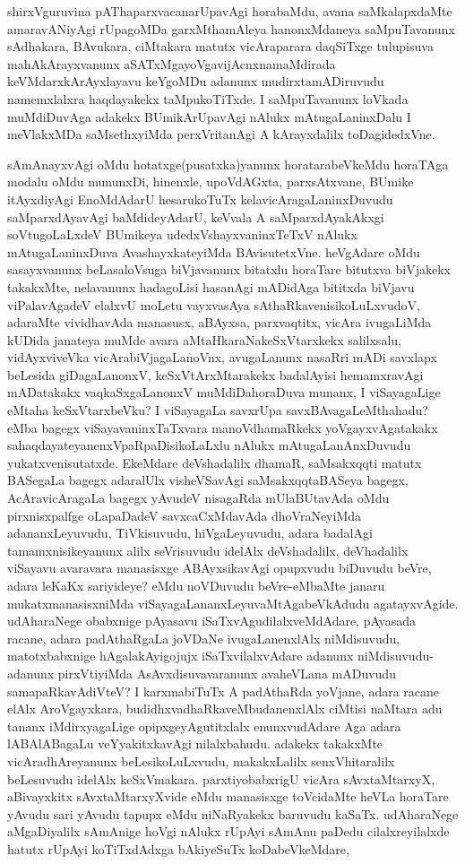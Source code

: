 shirxVguruvina pAThaparxvacanarUpavAgi horabaMdu, avana saMkalapxdaMte amara\-vANiyAgi \-rUpa\-goMDa garxMtha\-mAleya hanonxMdaneya saMpuTavanunx sAdha\-kara, BAvukara, ciMtakara matutx vicAraparara daqSiTxge tulupisuva mahAkArayxvanunx aSATxMgayoVgavijAcnxnamaMdirada keVMdarxkArAyxlayavu keYgoMDu adanunx mudirxta\-mADi\-ruvudu namemxlalxra haqdayakekx taMpukoTiTxde. I saMpuTavanunx loVkada muMdiDu\-vAga adakekx BUmikArUpavAgi nAlukx mAtugaLaninxDalu I meVlakxMDa saMsethx\-yiMda perxVritanAgi A kArayxdalilx toDagidedxVne.

sAmAnayxvAgi oMdu hotatxge(pusatxka)yanunx horatara\-beVkeMdu horaTAga modalu oMdu  mununxDi, hinenxle, upoV\-dAGxta, parxsAtxvane, BUmike itAyxdiyAgi EnoMdAdarU hesarukoTuTx kela\-vicAra\-gaLaninxDu\-vudu saMparxdAyavAgi baMdide\-yAdarU, keVvala A saMparxdAyakAkxgi soVtu\-goLaLxdeV BUmikeya udedxVshayx\-vaninxTeTxV nAlukx mAtugaLaninxDuva AvashayxkateyiMda BAvisutetxVne. heVgAdare oMdu sasayxvanunx beLasaloVsuga biVjavanunx bitatxlu horaTare bitutxva biVjakekx takakxMte, nelavanunx hadagoLisi hasanAgi mADidAga bititxda biVjavu viPalavAgadeV elalxvU moLetu vayxvasAya sAthaRka\-venisi\-koLuLx\-vudoV, adaraMte vividhavAda \hbox{manasusx}, aBAyxsa, parxvaqtitx, vicAra ivugaLiMda kUDida janateya muMde avara aMtaHkaraNa\-keSxVtarxkekx salilxsalu, vidAyxviveVka vicArabiVjagaLanoVnx, avugaLanunx nasaRri mADi savxlapx beLe\-sida giDagaLanonxV, keSxVtArxMtarakekx badalAyisi hemamxravAgi mADatakakx vaqkaSxgaLanonxV muMdiDa\-hora\-Duva munanx, I viSayagaLige eMtaha keSxVtarxbeVku? I viSaya\-gaLa savxrUpa savxBAvagaLeMthahadu? eMba bagegx viSayavaninxTaTxvara manoVdhamaRkekx yoVgayxvAgatakakx sahaqdayateyanenxVpaRpaDisikoLaLxlu nAlukx mAtugaLa\-nAnxDu\-vudu yukatxvenisutatxde. EkeMdare deVshadalilx dhamaR, saMsakxqqti matutx BASegaLa bagegx ada\-ralUlx visheVSavAgi saMsakxqqtaBASeya bagegx, AcAravicAragaLa bagegx yAvudeV nisa\-gaRda mUla\-BUta\-vAda oMdu pirxnisxpalfge oLapaDadeV savxcaCxMdavAda dhoVraNe\-yiMda adananxLeyuvudu, TiVkisuvudu, hiVgaLeyuvudu, adara badalAgi tamamxni\-sikeyanunx alilx seVrisuvudu idelAlx deVshadalilx, deVhadalilx viSayavu avaravara mana\-sisxge ABAyxsikavAgi opupxvudu biDuvudu beVre, adara leKaKx sariyideye? eMdu noVDuvudu beVre-eMbaMte janaru mukatxmanasisxniMda viSayagaLananxLeyu\break\-vaMtAgabeVkAdudu agatayx\-vAgide. udAharaNege obabxnige pAyasavu iSaTxvAgu\-dilalxveMdAdare, pAyasada racane, adara padAthaR\-gaLa  joVDaNe ivugaLanenxlAlx niMdisuvudu, matotxbabxnige hAgalakAyigojujx iSaTx\-vilalx\-vAdare \-adanunx niMdisu\-vudu- adanunx pirxVtiyiMda AsAvxdisuvavaranunx avaheVLana mADuvudu sama\-paRkavAdiVteV? I karxmabiTuTx A padAthaRda yoVjane, adara racane elAlx AroVgayx\-kara, budidhxvadhaRkaveMbudanenxlAlx ciMtisi naMtara adu tananx iMdirxyagaLige opipxge\-yAgutitxlalx enunxvudAdare Aga adara lABA\-lABagaLu veYyakitxkavAgi nilalxbahudu. adakekx takakxMte vicAradhAreyanunx beLesikoLuLxvudu, makakxLalilx senxVhitaralilx beLesu\-vudu idelAlx keSxVmakara. parxtiyobabxrigU vicAra sAvxtaMtarxyX, aBivayxkitx sAvxtaMtarxyX\-vide eMdu mana\-sisxge toVcidaMte heVLa horaTare yAvudu sari yAvudu tapupx eMdu niNaRyakekx baruvudu kaSaTx. udAharaNege aMgaDiyalilx sAmAnige hoVgi nAlukx rUpAyi sAmAnu paDedu cilalxreyilalxde hatutx rUpAyi koTiTxdAdxga bAkiyeSuTx koDabeVkeMdare, 